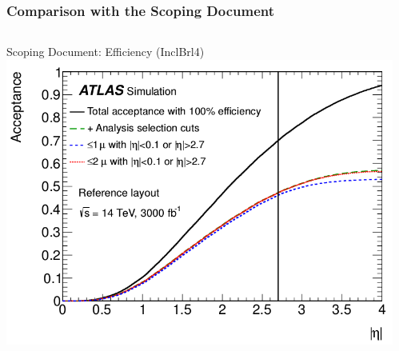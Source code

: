 \documentclass{beamer}
\begin{document}

\begin{frame}[t]
\frametitle{Comparison with the Scoping Document}
\begin{columns}
\begin{column}{.6\textwidth}
\centering
Scoping Document: Efficiency (InclBrl4)
\includegraphics[width=\textwidth]{scopingAcceptance}
\end{column}
\begin{column}{.4\textwidth}
\end{column}
\end{columns}

\medskip
\begin{center}
\end{center}
\end{frame}

\end{document}
